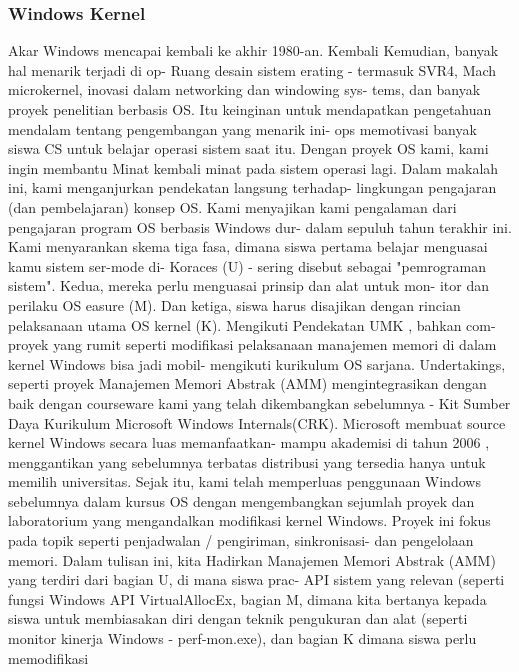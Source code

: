 			\subsubsection{Windows Kernel}
			 Akar Windows mencapai kembali ke akhir 1980-an. Kembali
			 Kemudian, banyak hal menarik terjadi di op-
			 Ruang desain sistem erating - termasuk SVR4, Mach
			 microkernel, inovasi dalam networking dan windowing sys-
			 tems, dan banyak proyek penelitian berbasis OS. Itu
			 keinginan untuk mendapatkan pengetahuan mendalam tentang pengembangan yang menarik ini-
			 ops memotivasi banyak siswa CS untuk belajar operasi
			 sistem saat itu. Dengan proyek OS kami, kami ingin membantu
			 Minat kembali minat pada sistem operasi lagi.
			 Dalam makalah ini, kami menganjurkan pendekatan langsung terhadap-
			 lingkungan pengajaran (dan pembelajaran) konsep OS. Kami menyajikan kami
			 pengalaman dari pengajaran program OS berbasis Windows dur-
			 dalam sepuluh tahun terakhir ini. Kami menyarankan skema tiga fasa,
			 dimana siswa pertama belajar menguasai
			 kamu
			 sistem ser-mode di-
			 Koraces (U) - sering disebut sebagai "pemrograman sistem".
			 Kedua, mereka perlu menguasai prinsip dan alat untuk mon-
			 itor dan perilaku OS easure (M). Dan ketiga, siswa
			 harus disajikan dengan rincian pelaksanaan utama OS
			 kernel (K). Mengikuti Pendekatan UMK , bahkan com-
			 proyek yang rumit seperti modifikasi pelaksanaan
			 manajemen memori di dalam kernel Windows bisa jadi mobil-
			 mengikuti kurikulum OS sarjana. Undertakings,
			 seperti proyek Manajemen Memori Abstrak (AMM)
			 mengintegrasikan dengan baik dengan courseware kami yang telah dikembangkan sebelumnya -
			 Kit Sumber Daya Kurikulum Microsoft Windows Internals(CRK).
			 Microsoft membuat source kernel Windows secara luas memanfaatkan-
			 mampu akademisi di tahun 2006 , menggantikan yang sebelumnya terbatas
			 distribusi yang tersedia hanya untuk memilih universitas.
			 Sejak itu, kami telah memperluas penggunaan Windows sebelumnya
			 dalam kursus OS dengan mengembangkan sejumlah proyek dan laboratorium
			 yang mengandalkan modifikasi kernel Windows. Proyek ini
			 fokus pada topik seperti penjadwalan / pengiriman, sinkronisasi-
			 dan pengelolaan memori. Dalam tulisan ini, kita
			 Hadirkan Manajemen Memori Abstrak (AMM)
			 yang terdiri dari bagian U, di mana siswa prac-
			 API sistem yang relevan (seperti fungsi Windows API
			 VirtualAllocEx, bagian M, dimana kita bertanya kepada siswa
			 untuk membiasakan diri dengan teknik pengukuran dan
			 alat (seperti monitor kinerja Windows - perf-mon.exe), dan bagian K	dimana siswa perlu memodifikasi

